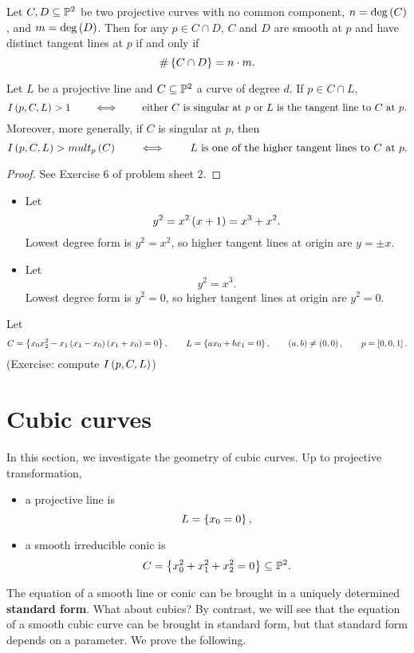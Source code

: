 \begin{corollary}
Let $ C, D \subseteq \P^2 $ be two projective curves with no common component, $ n = \deg\rb{C} $, and $ m = \deg\rb{D} $. Then for any $ p \in C \cap D $, $ C $ and $ D $ are smooth at $ p $ and have distinct tangent lines at $ p $ if and only if
$$ \#\cb{C \cap D} = n \cdot m. $$
\end{corollary}

\begin{proposition}
\label{prop:12.14}
Let $ L $ be a projective line and $ C \subseteq \P^2 $ a curve of degree $ d $. If $ p \in C \cap L $,
$$ I\rb{p, C, L} > 1 \qquad \iff \qquad \text{either} \ C \ \text{is singular at} \ p \ \text{or} \ L \ \text{is the tangent line to} \ C \ \text{at} \ p. $$
Moreover, more generally, if $ C $ is singular at $ p $, then
$$ I\rb{p, C, L} > mult_p\rb{C} \qquad \iff \qquad L \ \text{is one of the higher tangent lines to} \ C \ \text{at} \ p. $$
\end{proposition}

\begin{proof}
See Exercise $ 6 $ of problem sheet $ 2 $.
\end{proof}

\begin{example*}
\hfill
\begin{itemize}
\item Let
$$ y^2 = x^2\rb{x + 1} = x^3 + x^2. $$
Lowest degree form is $ y^2 = x^2 $, so higher tangent lines at origin are $ y = \pm x $.
\item Let
$$ y^2 = x^3. $$
Lowest degree form is $ y^2 = 0 $, so higher tangent lines at origin are $ y^2 = 0 $.
\end{itemize}
\end{example*}

\begin{example*}
Let
$$ C = \cb{x_0x_2^2 - x_1\rb{x_1 - x_0}\rb{x_1 + x_0} = 0}, \qquad L = \cb{ax_0 + bx_1 = 0}, \qquad \rb{a, b} \ne \rb{0, 0}, \qquad p = \sb{0, 0, 1}. $$
(Exercise: compute $ I\rb{p, C, L} $)
\end{example*}

\pagebreak

\section{Cubic curves}

In this section, we investigate the geometry of cubic curves. Up to projective transformation,
\begin{itemize}
\item a projective line is
$$ L = \cb{x_0 = 0}, $$
\item a smooth irreducible conic is
$$ C = \cb{x_0^2 + x_1^2 + x_2^2 = 0} \subseteq \P^2. $$
\end{itemize}
The equation of a smooth line or conic can be brought in a uniquely determined \textbf{standard form}. What about cubics? By contrast, we will see that the equation of a smooth cubic curve can be brought in standard form, but that standard form depends on a parameter. We prove the following.

